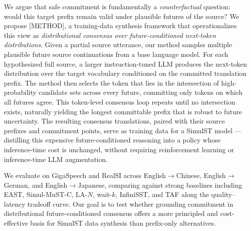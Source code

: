 We argue that safe commitment is fundamentally a \emph{counterfactual} question: would this target prefix remain valid under plausible futures of the source? We propose [METHOD], a training-data synthesis framework that operationalizes this view as \emph{distributional consensus over future-conditioned next-token distributions}. Given a partial source utterance, our method samples multiple plausible future source continuations from a base language model. For each hypothesized full source, a larger instruction-tuned LLM produces the next-token distribution over the target vocabulary conditioned on the committed translation prefix. The method then selects the token that lies in the intersection of high-probability candidate sets across every future, committing only tokens on which all futures agree. This token-level consensus loop repeats until no intersection exists, naturally yielding the longest committable prefix that is robust to future uncertainty. The resulting consensus translations, paired with their source prefixes and commitment points, serve as training data for a SimulST model --- distilling this expensive future-conditioned reasoning into a policy whose inference-time cost is unchanged, without requiring reinforcement learning or inference-time LLM augmentation.

We evaluate on GigaSpeech and RealSI across English$\rightarrow$Chinese, English$\rightarrow$German, and English$\rightarrow$Japanese, comparing against strong baselines including EAST, Simul-MuST-C, LA-$N$, wait-$k$, InfiniSST, and TAF along the quality--latency tradeoff curve. Our goal is to test whether grounding commitment in distributional future-conditioned consensus offers a more principled and cost-effective basis for SimulST data synthesis than prefix-only alternatives.